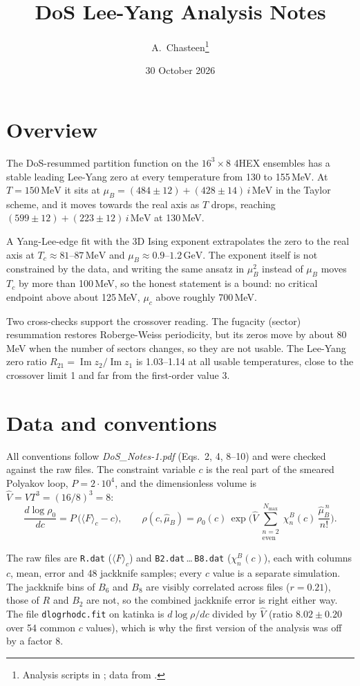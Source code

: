 \documentclass[11pt,a4paper]{article}
\title{DoS Lee-Yang Analysis Notes}
\author{A.~Chasteen\thanks{Analysis scripts in \code{\~{}/Desktop/Lattice\_QCD/Code/DoS/Playing\_around/}; data from \code{katinka:/data/4hex/ana\_dos/16x8/<T>/}.}}
\date{30 October 2026}
\newcommand{\muB}{\mu_B}
\newcommand{\hmu}{\hat{\mu}_B}
\newcommand{\hV}{\hat{V}}
\newcommand{\MeV}{\,\mathrm{MeV}}
\newcommand{\Nmax}{N_{\max}}
\newcommand{\code}[1]{\texttt{#1}}
\begin{document}
\maketitle

\section{Overview}

The DoS-resummed partition function on the $16^3\times 8$ 4HEX ensembles has a stable leading Lee-Yang zero at every temperature from 130 to 155\,MeV. At $T=150\MeV$ it sits at $\muB = (484\pm12) + (428\pm14)\,i\MeV$ in the Taylor scheme, and it moves towards the real axis as $T$ drops, reaching $(599\pm12)+(223\pm12)\,i\MeV$ at 130\,MeV.

A Yang-Lee-edge fit with the 3D Ising exponent extrapolates the zero to the real axis at $T_c\approx 81$--$87\MeV$ and $\muB\approx 0.9$--$1.2\,\mathrm{GeV}$. The exponent itself is not constrained by the data, and writing the same ansatz in $\muB^2$ instead of $\muB$ moves $T_c$ by more than 100\,MeV, so the honest statement is a bound: no critical endpoint above about 125\,MeV, $\mu_c$ above roughly 700\,MeV.

Two cross-checks support the crossover reading. The fugacity (sector) resummation restores Roberge-Weiss periodicity, but its zeros move by about 80\,MeV when the number of sectors changes, so they are not usable. The Lee-Yang zero ratio $R_{21}=\operatorname{Im}z_2/\operatorname{Im}z_1$ is 1.03--1.14 at all usable temperatures, close to the crossover limit 1 and far from the first-order value 3.

\section{Data and conventions}

All conventions follow \emph{DoS\_Notes-1.pdf} (Eqs.~2, 4, 8--10) and were checked against the raw files. The constraint variable $c$ is the real part of the smeared Polyakov loop, $P=2\cdot10^4$, and the dimensionless volume is $\hV=VT^3=(16/8)^3=8$:
\begin{equation}
\frac{d\log\rho_0}{dc}=P\,\big(\langle F\rangle_c-c\big),\qquad
\rho(c,\hmu)=\rho_0(c)\,\exp\!\Big(\hV\sum_{\substack{n=2\\ \text{even}}}^{\Nmax}\chi^B_n(c)\,\frac{\hmu^{\,n}}{n!}\Big).
\end{equation}

The raw files are \code{R.dat} ($\langle F\rangle_c$) and \code{B2.dat}\,\dots\,\code{B8.dat} ($\chi^B_n(c)$), each with columns $c$, mean, error and 48 jackknife samples; every $c$ value is a separate simulation. The jackknife bins of $B_6$ and $B_8$ are visibly correlated across files ($r=0.21$), those of $R$ and $B_2$ are not, so the combined jackknife error is right either way. The file \code{dlogrhodc.fit} on katinka is $d\log\rho/dc$ divided by $\hV$ (ratio $8.02\pm0.20$ over 54 common $c$ values), which is why the first version of the analysis was off by a factor 8.
\end{document}
